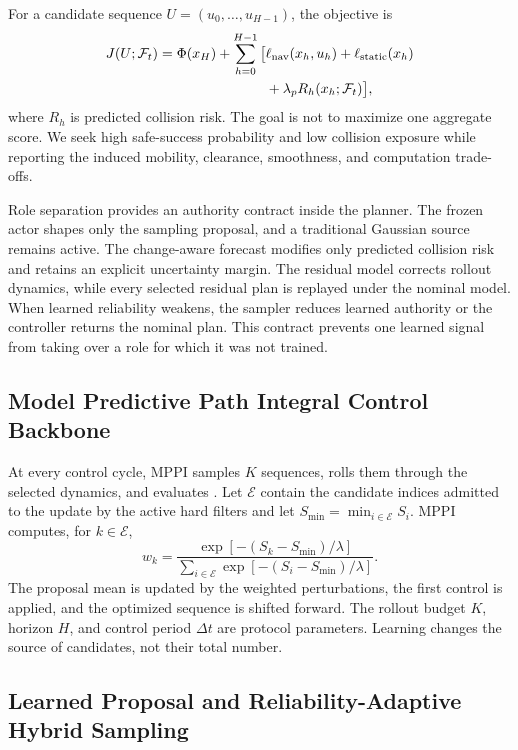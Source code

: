 \documentclass[conference]{IEEEtran}
\newcommand{\reviewbox}[2]{%
    \begingroup
    \setlength{\fboxsep}{0.35pt}%
    \setlength{\fboxrule}{0.45pt}%
    \hyperref[#1]{\fcolorbox{red}{white}{\vphantom{I}#2}}%
    \endgroup}
\newcommand{\revieweqref}[1]{\reviewbox{#1}{\textup{(\ref*{#1})}}}
\newcommand{\revieweqref}[1]{\eqref{#1}}
\begin{document}
For a candidate sequence $U=(u_0,\ldots,u_{H-1})$, the objective is
\begin{equation}
\begin{split}
J(U;\mathcal{F}_t)=\Phi(x_H)+\sum_{h=0}^{H-1}\big[&\ell_{\rm nav}(x_h,u_h)+\ell_{\rm static}(x_h)\\
&+\lambda_p R_h(x_h;\mathcal{F}_t)\big],
\end{split}
\label{eq:objective}
\end{equation}
where $R_h$ is predicted collision risk. The goal is not to maximize one aggregate score. We seek high safe-success probability and low collision exposure while reporting the induced mobility, clearance, smoothness, and computation trade-offs.

Role separation provides an authority contract inside the planner. The frozen actor shapes only the sampling proposal, and a traditional Gaussian source remains active. The change-aware forecast modifies only predicted collision risk and retains an explicit uncertainty margin. The residual model corrects rollout dynamics, while every selected residual plan is replayed under the nominal model. When learned reliability weakens, the sampler reduces learned authority or the controller returns the nominal plan. This contract prevents one learned signal from taking over a role for which it was not trained.

\subsection{Model Predictive Path Integral Control Backbone}

At every control cycle, MPPI samples $K$ sequences, rolls them through the selected dynamics, and evaluates \revieweqref{eq:objective}. Let $\mathcal{E}$ contain the candidate indices admitted to the update by the active hard filters and let $S_{\min}=\min_{i\in\mathcal{E}}S_i$. MPPI computes, for $k\in\mathcal{E}$,
\begin{equation}
    w_k=\frac{\exp[-(S_k-S_{\min})/\lambda]}
    {\sum_{i\in\mathcal{E}}\exp[-(S_i-S_{\min})/\lambda]}.
    \label{eq:weights}
\end{equation}
The proposal mean is updated by the weighted perturbations, the first control is applied, and the optimized sequence is shifted forward. The rollout budget $K$, horizon $H$, and control period $\Delta t$ are protocol parameters. Learning changes the source of candidates, not their total number.

\subsection{Learned Proposal and Reliability-Adaptive Hybrid Sampling}
\end{document}

